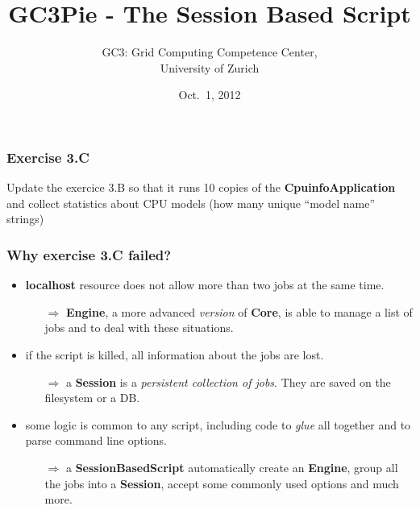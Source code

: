 \documentclass[english,serif,mathserif,xcolor=pdftex,dvipsnames,table]{beamer}
\title[The Session Based Script]{%
GC3Pie - The Session Based Script
}
\author[Antonio Messina]{%
  GC3: Grid Computing Competence Center, \\
  University of Zurich
}
\date{Oct.~1, 2012}
\begin{document}
\maketitle

\begin{frame}
  \frametitle{Exercise 3.C} 

  Update the exercice 3.B so that it runs 10 copies of the
  \textbf{CpuinfoApplication} and collect statistics about CPU models
  (how many unique ``model name'' strings)
\end{frame}

\begin{frame}[fragile]
  \frametitle{Why exercise 3.C failed?}
  \begin{itemize}
  \item \textbf{localhost} resource does not allow more than two jobs
    at the same time.

    \pause
    \begin{itemize}
    \item[$\Rightarrow$] \textbf{Engine}, a more advanced
      \textit{version} of \textbf{Core}, is able to manage a list of
      jobs and to deal with these situations.
    \end{itemize}
    
    \pause
    \+
  \item if the script is killed, all information about the jobs are
    lost.
    \pause
    \begin{itemize}
    \item [$\Rightarrow$] a \textbf{Session} is a \textit{persistent
        collection of jobs}. They are saved on the filesystem or a DB.
    \end{itemize}
    
    \pause  
    \+
  \item some logic is common to any script, including code to
    \textit{glue} all together and to parse command line options.  \pause
    \begin{itemize}
    \item [$\Rightarrow$] a \textbf{SessionBasedScript} automatically
      create an \textbf{Engine}, group all the jobs into a
      \textbf{Session}, accept some commonly used options and much more.
    \end{itemize}
  \end{itemize}
\end{frame}
\end{document}
